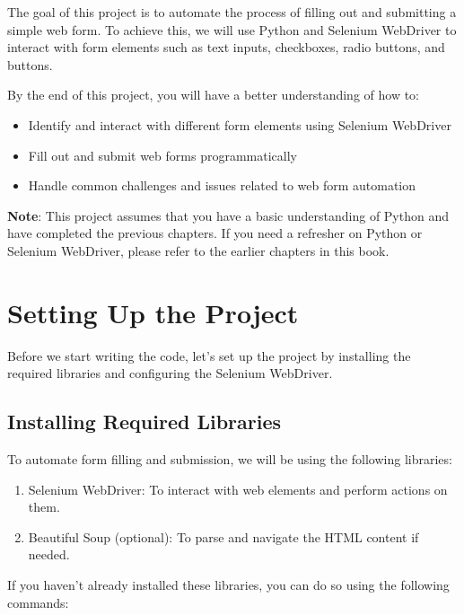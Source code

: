 \documentclass[
  paper=a4,
  ,captions=tableheading
]{scrartcl}
\providecommand{\tightlist}{%
  \setlength{\itemsep}{0pt}\setlength{\parskip}{0pt}}
\begin{document}
The goal of this project is to automate the process of filling out and
submitting a simple web form. To achieve this, we will use Python and
Selenium WebDriver to interact with form elements such as text inputs,
checkboxes, radio buttons, and buttons.

By the end of this project, you will have a better understanding of how
to:

\begin{itemize}
\tightlist
\item
  Identify and interact with different form elements using Selenium
  WebDriver
\item
  Fill out and submit web forms programmatically
\item
  Handle common challenges and issues related to web form automation
\end{itemize}

\textbf{Note}: This project assumes that you have a basic understanding
of Python and have completed the previous chapters. If you need a
refresher on Python or Selenium WebDriver, please refer to the earlier
chapters in this book.

\hypertarget{setting-up-the-project}{%
\section{Setting Up the Project}\label{setting-up-the-project}}

Before we start writing the code, let's set up the project by installing
the required libraries and configuring the Selenium WebDriver.

\hypertarget{installing-required-libraries}{%
\subsection{Installing Required
Libraries}\label{installing-required-libraries}}

To automate form filling and submission, we will be using the following
libraries:

\begin{enumerate}
\def\labelenumi{\arabic{enumi}.}
\tightlist
\item
  Selenium WebDriver: To interact with web elements and perform actions
  on them.
\item
  Beautiful Soup (optional): To parse and navigate the HTML content if
  needed.
\end{enumerate}

If you haven't already installed these libraries, you can do so using
the following commands:
\end{document}
